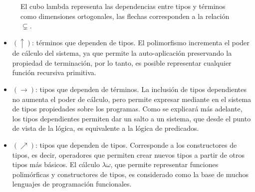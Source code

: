 \documentclass[]{report}
\begin{document}
	\begin{figure}[H]
		\centering
		\caption{El cubo lambda representa las dependencias entre tipos y términos como dimensiones ortogonales, las flechas corresponden a la relación $\subsetneq$.}
	\end{figure}
	
	\begin{itemize}
		\item $(\uparrow)$: términos que dependen de tipos.
		El polimorfismo incrementa el poder de cálculo del sistema, ya que permite la auto-aplicación preservando la propiedad de terminación, por lo tanto, es posible representar cualquier función recursiva primitiva.
		\item $(\rightarrow)$: tipos que dependen de términos.
		La inclusión de tipos dependientes no aumenta el poder de cálculo, pero permite expresar mediante en el sistema de tipos propiedades sobre los programas.
		Como se explicará más adelante, los tipos dependientes permiten dar un salto a un sistema, que desde el punto de vista de la lógica, es equivalente a la lógica de predicados.
		\item $(\nearrow)$: tipos que dependen de tipos.
		Corresponde a los constructores de tipos, es decir, operadores que permiten crear nuevos tipos a partir de otros tipos más básicos.
		El cálculo $\lambda\omega$, que permite representar funciones polimórficas y constructores de tipos, es considerado como la base de muchos lenguajes de programación funcionales.
	\end{itemize}
	
\end{document}
